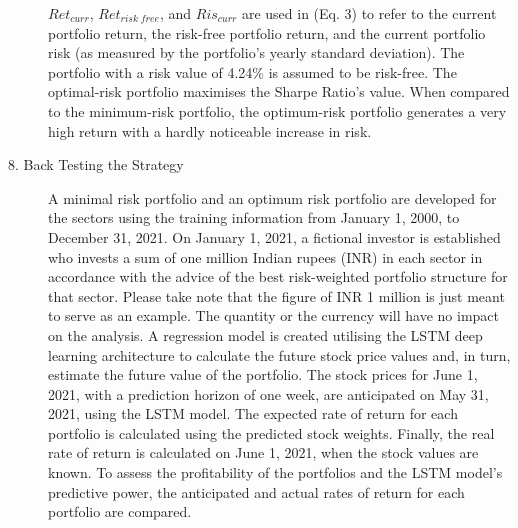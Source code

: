 \begin{description}
$Ret_{curr}$, $Ret_{risk\;free}$, and $Ris_{curr}$ are used in (Eq. 3) to refer to the current portfolio return, the risk-free portfolio return, and the current portfolio risk (as measured by the portfolio's yearly standard deviation). The portfolio with a risk value of 4.24\% is assumed to be risk-free. The optimal-risk portfolio maximises the Sharpe Ratio's value. When compared to the minimum-risk portfolio, the optimum-risk portfolio generates a very high return with a hardly noticeable increase in risk.

\item [8. Back Testing the Strategy] A minimal risk portfolio and an optimum risk portfolio are developed for the sectors using the training information from January 1, 2000, to December 31, 2021. On January 1, 2021, a fictional investor is established who invests a sum of one million Indian rupees (INR) in each sector in accordance with the advice of the best risk-weighted portfolio structure for that sector. Please take note that the figure of INR 1 million is just meant to serve as an example. The quantity or the currency will have no impact on the analysis. A regression model is created utilising the LSTM deep learning architecture to calculate the future stock price values and, in turn, estimate the future value of the portfolio. The stock prices for June 1, 2021, with a prediction horizon of one week, are anticipated on May 31, 2021, using the LSTM model. The expected rate of return for each portfolio is calculated using the predicted stock weights. Finally, the real rate of return is calculated on June 1, 2021, when the stock values are known. To assess the profitability of the portfolios and the LSTM model's predictive power, the anticipated and actual rates of return for each portfolio are compared.
\end{description}

